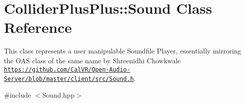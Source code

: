 \hypertarget{classColliderPlusPlus_1_1Sound}{\section{Collider\-Plus\-Plus\-:\-:Sound Class Reference}
\label{classColliderPlusPlus_1_1Sound}
}


This class represents a user manipulable Soundfile Player, essentially mirroring the O\-A\-S class of the same name by Shreenidhi Chowkwale  \href{https://github.com/CalVR/Open-Audio-Server/blob/master/client/src/Sound.h}{\tt https\-://github.\-com/\-Cal\-V\-R/\-Open-\/\-Audio-\/\-Server/blob/master/client/src/\-Sound.\-h}.  




{\ttfamily \#include $<$Sound.\-hpp$>$}

